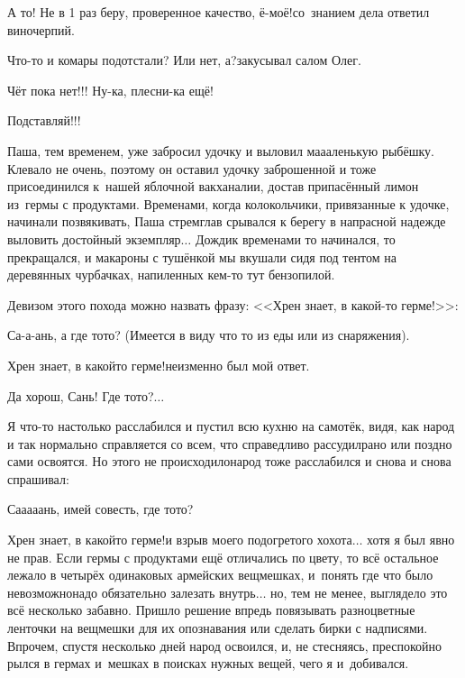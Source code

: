 \diagdash А то! Не в 1 раз беру, проверенное качество, ё-моё!\mdash со~знанием дела ответил виночерпий.

\diagdash Что-то и комары подотстали? Или нет, а?\mdash закусывал салом Олег.

\diagdash Чёт пока нет!!! Ну-ка, плесни-ка ещё!

\diagdash Подставляй!!!

Паша, тем временем, уже забросил удочку и выловил ма\sdash а\sdash аленькую рыбёшку. Клевало не очень, поэтому он оставил удочку заброшенной и тоже присоединился к~нашей яблочной вакханалии, достав припасённый лимон из~гермы с продуктами. Временами, когда колокольчики, привязанные к удочке, начинали позвякивать, Паша стремглав срывался к берегу в напрасной надежде выловить достойный экземпляр$\ldots$ Дождик временами то начинался, то прекращался, и макароны с тушёнкой мы вкушали сидя под тентом на деревянных чурбачках, напиленных кем-то тут бензопилой. 

Девизом этого похода можно назвать фразу: <<Хрен знает, в какой-то герме!>>:

\diagdash Са-а-ань, а где то\sdash то? (Имеется в виду что то из еды или из снаряжения). 

\diagdash Хрен знает, в какой\sdash то герме!\mdash неизменно был мой ответ. 

\diagdash Да хорош, Сань! Где то\sdash то?$\ldots$

Я что-то настолько расслабился и пустил всю кухню на самотёк, видя, как народ и так нормально справляется со всем, что справедливо рассудил\mdash рано или поздно сами освоятся. Но этого не происходило\mdash народ тоже расслабился и снова и снова спрашивал: 

\diagdash Са\sdash а\sdash а\sdash а\sdash ань, имей совесть, где то\sdash то? 

\diagdash Хрен знает, в какой\sdash то герме!\mdash и взрыв моего подогретого хохота$\ldots$ хотя я был явно не прав. Если гермы с продуктами ещё отличались по цвету, то всё остальное лежало в четырёх одинаковых армейских вещмешках, и~понять где что было невозможно\mdash надо обязательно залезать внутрь$\ldots$ но, тем не менее, выглядело это всё несколько забавно. Пришло решение впредь повязывать разноцветные ленточки на вещмешки для их опознавания или сделать бирки с надписями. Впрочем, спустя несколько дней народ освоился, и, не стесняясь, преспокойно рылся в гермах и~мешках в поисках нужных вещей, чего я и~добивался.

